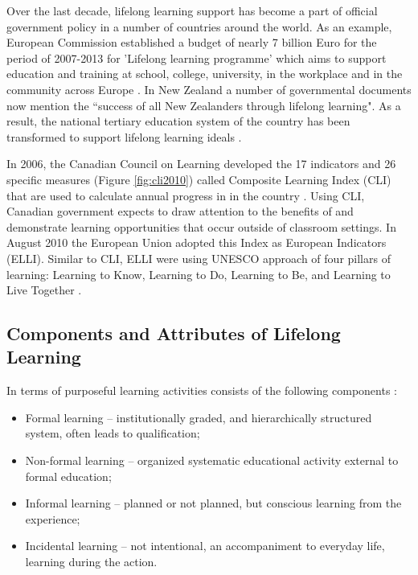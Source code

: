 Over the last decade, lifelong learning support has become a part of official
government policy in a number of countries around the world. As an example,
European Commission established a budget of nearly 7 billion Euro for the
period of 2007-2013 for 'Lifelong learning programme' which aims to support
education and training at school, college, university, in the workplace and in
the community across Europe \citep{TheEducation2009}. In New Zealand a number of
governmental documents \citep{NewZealandMinistryofEducation2008} now mention
the ``success of all New Zealanders through lifelong learning". As a result, the
national tertiary education system of the country has been transformed to
support lifelong learning ideals \citep{Benseman2006}.

In 2006, the Canadian Council on Learning developed the 17 indicators and 26
specific measures (Figure \ref{fig:cli2010}) called Composite Learning Index
(CLI) that are used to calculate annual progress in \LLLs in the country
\citep{CanadianCouncilonLearning2011}. Using CLI, Canadian government expects to
draw attention to the benefits of \LLLs and demonstrate learning opportunities
that occur outside of classroom settings. In August 2010 the European Union
adopted this Index as European \LLLc Indicators (ELLI). Similar to CLI, ELLI
were using UNESCO approach of four pillars of learning: Learning to Know,
Learning to Do, Learning to Be, and Learning to Live Together
\citep{ELLIDevelopmentTeam2010}.

\subsection{Components and Attributes of Lifelong Learning}
In terms of purposeful learning activities \LLLs consists of the following
components \citep{Longworth2003, Tuijnman2002}:

\begin{itemize}
  \item Formal learning -- institutionally graded, and hierarchically structured
system, often leads to qualification;
  \item Non-formal learning -- organized systematic educational activity
  external to formal education;
  \item Informal learning -- planned or not planned, but conscious learning from
the experience;
  \item Incidental learning -- not intentional, an accompaniment to everyday
  life, learning during the action.
\end{itemize} 

